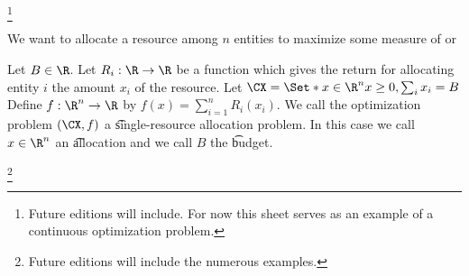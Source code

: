 
\footnote{Future editions will include. For now this sheet serves as an example of a continuous optimization problem.}


We want to allocate a resource among $n$ entities to maximize some measure of  or 

Let $B \in \R$.
Let $R_i: \R \to \R$ be a function which gives the return for allocating entity $i$ the amount $x_i$ of the resource.
Let $\CX = \Set*{x \in \R^n}{x \geq 0, \sum_{i}x_i = B}$
Define $f: \R^n \to \R$ by $f(x) = \sum_{i = 1}^{n} R_i(x_i)$.
We call the optimization problem $(\CX, f)$ a \t{single-resource allocation problem}.
In this case we call $x \in \R^{n}$ an \t{allocation} and we call $B$ the \t{budget}.

\footnote{Future editions will include the numerous examples.}

\blankpage
